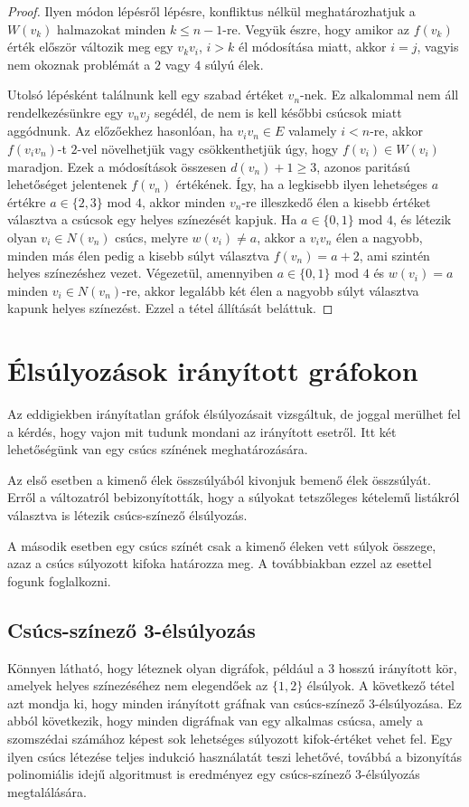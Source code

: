 \documentclass[12pt, a4paper]{report}
\theoremstyle{remark}
\theoremstyle{definition}
\begin{document}
\begin{proof}
Ilyen módon lépésről lépésre, konfliktus nélkül meghatározhatjuk a $W(v_k)$ halmazokat minden $k \leq n - 1$-re. Vegyük észre, hogy amikor az $f(v_k)$ érték először változik meg egy $v_k v_i$, $i > k$ él módosítása miatt, akkor $i = j$, vagyis nem okoznak problémát a $2$ vagy $4$ súlyú élek.

Utolsó lépésként találnunk kell egy szabad értéket $v_n$-nek. Ez alkalommal nem áll rendelkezésünkre egy $v_n v_j$ segédél, de nem is kell későbbi csúcsok miatt aggódnunk. Az előzőekhez hasonlóan, ha $v_i v_n \in E$ valamely $i < n$-re, akkor $f(v_i v_n)$-t $2$-vel növelhetjük vagy csökkenthetjük úgy, hogy $f(v_i) \in W(v_i)$ maradjon. Ezek a módosítások összesen $d(v_n) +1 \geq 3$, azonos paritású lehetőséget jelentenek $f(v_n)$ értékének. Így, ha a legkisebb ilyen lehetséges $a$ értékre $a \in \lbrace 2, 3 \rbrace$ mod $4$, akkor minden $v_n$-re illeszkedő élen a kisebb értéket választva a csúcsok egy helyes színezését kapjuk. Ha $a \in \lbrace 0, 1 \rbrace$ mod $4$, és létezik olyan $v_i \in N(v_n)$ csúcs, melyre $w(v_i) \neq a$, akkor a $v_i v_n$ élen a nagyobb, minden más élen pedig a kisebb súlyt választva $f(v_n) = a + 2$, ami szintén helyes színezéshez vezet. Végezetül, amennyiben $a \in \lbrace 0, 1 \rbrace$ mod $4$ és $w(v_i) = a$ minden $v_i \in N(v_n)$-re, akkor legalább két élen a nagyobb súlyt választva kapunk helyes színezést. Ezzel a tétel állítását beláttuk.
\end{proof}

\chapter{Élsúlyozások irányított gráfokon}
Az eddigiekben irányítatlan gráfok élsúlyozásait vizsgáltuk, de joggal merülhet fel a kérdés, hogy vajon mit tudunk mondani az irányított esetről. Itt két lehetőségünk van egy csúcs színének meghatározására. 

Az első esetben a kimenő élek összsúlyából kivonjuk bemenő élek összsúlyát. Erről a változatról \citeauthor{Bartnicki2009} \cite{Bartnicki2009} bebizonyították, hogy a súlyokat tetszőleges kételemű listákról választva is létezik csúcs-színező élsúlyozás.

A második esetben egy csúcs színét csak a kimenő éleken vett súlyok összege, azaz a csúcs súlyozott kifoka határozza meg. A továbbiakban ezzel az esettel fogunk foglalkozni.

\section{Csúcs-színező 3-élsúlyozás}
Könnyen látható, hogy léteznek olyan digráfok, például a $3$ hosszú irányított kör, amelyek helyes színezéséhez nem elegendőek az $\lbrace 1, 2 \rbrace$ élsúlyok. A következő tétel azt mondja ki, hogy minden irányított gráfnak van csúcs-színező 3-élsúlyozása. Ez abból következik, hogy minden digráfnak van egy alkalmas csúcsa, amely a szomszédai számához képest sok lehetséges súlyozott kifok-értéket vehet fel. Egy ilyen csúcs létezése teljes indukció használatát teszi lehetővé, továbbá a bizonyítás polinomiális idejű algoritmust is eredményez egy csúcs-színező 3-élsúlyozás megtalálására.
\end{document}
